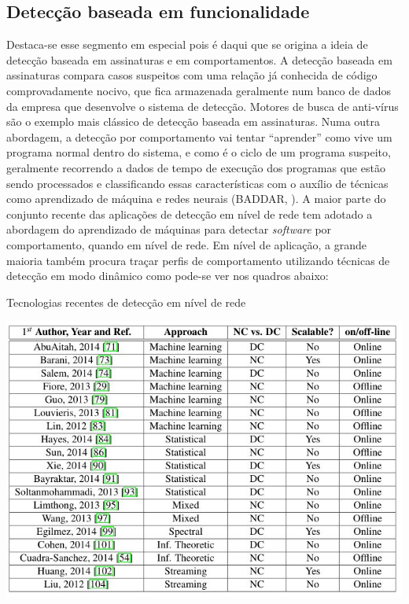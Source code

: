 \subsection{Detecção baseada em funcionalidade}
\label{ss.deteccao_funcionalidade} Destaca-se esse segmento em especial pois é
daqui que se origina a ideia de detecção baseada em assinaturas e em
comportamentos. A detecção baseada em assinaturas compara casos suspeitos com
uma relação já conhecida de código comprovadamente nocivo, que fica armazenada
geralmente num banco de dados da empresa que desenvolve o sistema de detecção.
Motores de busca de anti-vírus são o exemplo mais clássico de detecção baseada
em assinaturas. Numa outra abordagem, a detecção por comportamento vai tentar
``aprender'' como vive um programa normal dentro do sistema, e como é o ciclo
de um programa suspeito, geralmente recorrendo a dados de tempo de execução
dos programas que estão sendo processados e classificando essas
características com o auxílio de técnicas como aprendizado de máquina e redes
neurais (BADDAR, \citeyear{baddarxx}). A maior parte do conjunto recente das aplicações de detecção
em nível de rede tem adotado a abordagem do aprendizado de máquinas para
detectar \textit{software} por comportamento, quando em nível de rede. Em nível de
aplicação, a grande maioria também procura traçar perfis de comportamento
utilizando técnicas de detecção em modo dinâmico como pode-se ver nos quadros
abaixo:

\begin{table}[h]
\caption{\small Tecnologias recentes de detecção em nível de rede}
\centering
\includegraphics[scale=0.7]{figs/tabela_deteccao_nivel_rede.JPG}
\label{f.tabeladeteccao_rede}
\end{table}


